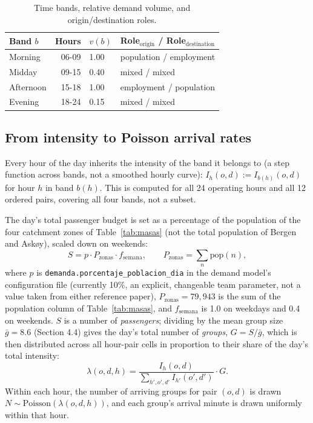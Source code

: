 \documentclass[11pt,a4paper]{article}
\begin{document}
\begin{table}[H]
\centering
\caption{Time bands, relative demand volume, and origin/destination roles.}
\label{tab:franjas}
\begin{tabular}{lrll}
\toprule
Band $b$ & Hours & $v(b)$ & Role$_{\text{origin}}$ / Role$_{\text{destination}}$ \\
\midrule
Morning & 06-09 & 1.00 & population / employment \\
Midday  & 09-15 & 0.40 & mixed / mixed \\
Afternoon & 15-18 & 1.00 & employment / population \\
Evening & 18-24 & 0.15 & mixed / mixed \\
\bottomrule
\end{tabular}
\end{table}

\subsection{From intensity to Poisson arrival rates}

Every hour of the day inherits the intensity of the band it belongs to (a step function across bands, not a smoothed hourly curve): $I_h(o,d) := I_{b(h)}(o,d)$ for hour $h$ in band $b(h)$. This is computed for all 24 operating hours and all 12 ordered pairs, covering all four bands, not a subset.

The day's total passenger budget is set as a percentage of the population of the four catchment zones of Table~\ref{tab:masas} (not the total population of Bergen and Askøy), scaled down on weekends:
\begin{equation}
\label{eq:escala}
S = p \cdot P_{\text{zonas}} \cdot f_{\text{semana}}, \qquad P_{\text{zonas}} = \sum_n \text{pop}(n),
\end{equation}
where $p$ is \texttt{demanda.porcentaje\_poblacion\_dia} in the demand model's configuration file (currently 10\%, an explicit, changeable team parameter, not a value taken from either reference paper), $P_{\text{zonas}} = 79{,}943$ is the sum of the population column of Table~\ref{tab:masas}, and $f_{\text{semana}}$ is 1.0 on weekdays and 0.4 on weekends. $S$ is a number of \emph{passengers}; dividing by the mean group size $\bar{g} = 8.6$ (Section 4.4) gives the day's total number of \emph{groups}, $G = S / \bar{g}$, which is then distributed across all hour-pair cells in proportion to their share of the day's total intensity:
\begin{equation}
\lambda(o,d,h) = \frac{I_h(o,d)}{\sum_{h',o',d'} I_{h'}(o',d')} \cdot G.
\end{equation}
Within each hour, the number of arriving groups for pair $(o,d)$ is drawn $N \sim \text{Poisson}(\lambda(o,d,h))$, and each group's arrival minute is drawn uniformly within that hour.
\end{document}

